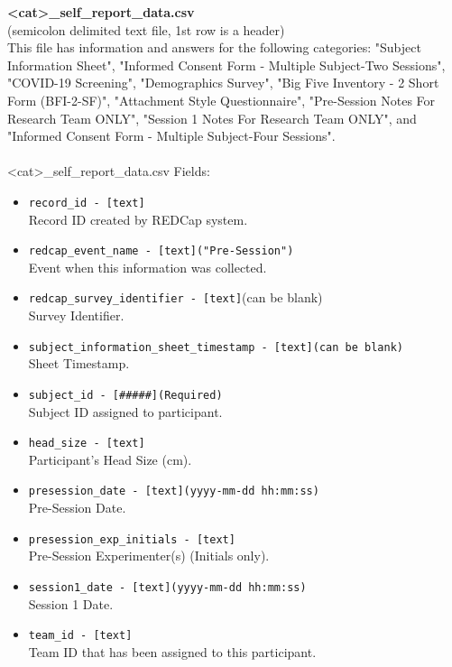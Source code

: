 \begin{description}
\begin{addmargin}[0em]{0em}
    \begin{addmargin}[1em]{0em} %
        \textbf{<cat>\_self\_report\_data.csv}\\(semicolon delimited text file, 1st row is a header)\\
        This file has information and answers for the following categories: "Subject Information Sheet",
        "Informed Consent Form - Multiple Subject-Two Sessions", "COVID-19 Screening", "Demographics Survey",
        "Big Five Inventory - 2 Short Form (BFI-2-SF)", "Attachment Style Questionnaire",
        "Pre-Session Notes For Research Team ONLY", "Session 1 Notes For Research Team ONLY",
        and "Informed Consent Form - Multiple Subject-Four Sessions".\\\\ 
        <cat>\_self\_report\_data.csv Fields:
        \begin{itemize}
            \item \verb|record_id - [text]|\\Record ID created by REDCap system.
            \item \verb|redcap_event_name - [text]("Pre-Session")|\\Event when this information was collected.
            \item \verb|redcap_survey_identifier - [text]|(can be blank)\\Survey Identifier.
            \item \verb|subject_information_sheet_timestamp - [text](can be blank)|\\Sheet Timestamp.
            \item \verb|subject_id - [#####](Required)|\\Subject ID assigned to participant.
            \item \verb|head_size - [text]|\\Participant's Head Size (cm).
            \item \verb|presession_date - [text](yyyy-mm-dd hh:mm:ss)|\\Pre-Session Date.
            \item \verb|presession_exp_initials - [text]|\\Pre-Session Experimenter(s) (Initials only).
            \item \verb|session1_date - [text](yyyy-mm-dd hh:mm:ss)|\\Session 1 Date.
            \item \verb|team_id - [text]|\\Team ID that has been assigned to this participant.

\end{itemize}
\end{addmargin}
\end{addmargin}
\end{description}
